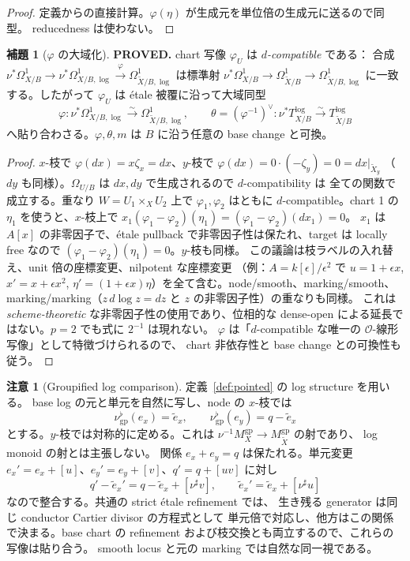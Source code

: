 \documentclass[11pt,a4paper]{article}
\numberwithin{equation}{section}
\theoremstyle{definition}
\newtheorem{lemma}[definition]{補題}
\newtheorem{remark}[definition]{注意}
\newcommand{\OO}{\mathcal O}
\newcommand{\tX}{\widetilde X}
\begin{document}
\begin{proof}
定義からの直接計算。$\varphi(\eta)$ が生成元を単位倍の生成元に送るので同型。
reducedness は使わない。
\end{proof}

\begin{lemma}[$\varphi$ の大域化]\label{lem:phi-glue}
\textbf{PROVED.} chart 写像 $\varphi_U$ は \emph{$d$-compatible} である：
合成 $\nu^*\Omega^1_{X/B}\to\nu^*\Omega^1_{X/B,\log}\xrightarrow{\varphi}
\Omega^1_{\tX/B,\log}$ は標準射 $\nu^*\Omega^1_{X/B}\to\Omega^1_{\tX/B}
\to\Omega^1_{\tX/B,\log}$ に一致する。したがって $\varphi_U$ は
étale 被覆に沿って大域同型
\[
  \varphi:\nu^*\Omega^1_{X/B,\log}\xrightarrow{\sim}\Omega^1_{\tX/B,\log},\qquad
  \theta=(\varphi^{-1})^\vee:\nu^*T^{\log}_{X/B}\xrightarrow{\sim}T^{\log}_{\tX/B}
\]
へ貼り合わさる。$\varphi,\theta,m$ は $B$ に沿う任意の base change と可換。
\end{lemma}

\begin{proof}
$x$-枝で $\varphi(dx)=x\zeta_x=dx$、$y$-枝で $\varphi(dx)=0\cdot(-\zeta_y)=0=dx|_{\tX_y}$
（$dy$ も同様）。$\Omega_{U/B}$ は $dx,dy$ で生成されるので $d$-compatibility は
全ての関数で成立する。重なり $W=U_1\times_XU_2$ 上で $\varphi_1,\varphi_2$ はともに
$d$-compatible。chart 1 の $\eta_1$ を使うと、$x$-枝上で
$x_1(\varphi_1-\varphi_2)(\eta_1)=(\varphi_1-\varphi_2)(dx_1)=0$。
$x_1$ は $A[x]$ の非零因子で、étale pullback で非零因子性は保たれ、target は
locally free なので $(\varphi_1-\varphi_2)(\eta_1)=0$。$y$-枝も同様。
この議論は枝ラベルの入れ替え、unit 倍の座標変更、nilpotent な座標変更
（例：$A=k[\epsilon]/\epsilon^2$ で $u=1+\epsilon x$, $x'=x+\epsilon x^2$,
$\eta'=(1+\epsilon x)\eta$）を全て含む。node/smooth、marking/smooth、
marking/marking（$z\,d\log z=dz$ と $z$ の非零因子性）の重なりも同様。
これは \emph{scheme-theoretic} な非零因子性の使用であり、位相的な dense-open
による延長ではない。$p=2$ でも式に $2^{-1}$ は現れない。
$\varphi$ は「$d$-compatible な唯一の $\OO$-線形写像」として特徴づけられるので、
chart 非依存性と base change との可換性も従う。
\end{proof}

\begin{remark}[Groupified log comparison]\label{rem:groupified-comparison}
定義~\ref{def:pointed} の log structure を用いる。
base log の元と単元を自然に写し、node の \(x\)-枝では
\[
 \nu^\flat_{\mathrm{gp}}(e_x)=\widetilde e_x,
 \qquad
 \nu^\flat_{\mathrm{gp}}(e_y)=q-\widetilde e_x
\]
とする。\(y\)-枝では対称的に定める。これは
\(\nu^{-1}M_X^{\mathrm{gp}}\to M_{\tX}^{\mathrm{gp}}\) の射であり、
log monoid の射とは主張しない。
関係 \(e_x+e_y=q\) は保たれる。単元変更
\(e_x'=e_x+[u]\)、\(e_y'=e_y+[v]\)、\(q'=q+[uv]\) に対し
\[
 q'-\widetilde e_x'
 =q-\widetilde e_x+[\nu^\sharp v],
 \qquad \widetilde e_x'=\widetilde e_x+[\nu^\sharp u]
\]
なので整合する。共通の strict étale refinement では、
生き残る generator は同じ conductor Cartier divisor の方程式として
単元倍で対応し、他方はこの関係で決まる。base chart の refinement
および枝交換とも両立するので、これらの写像は貼り合う。
smooth locus と元の marking では自然な同一視である。
\end{remark}
\end{document}
